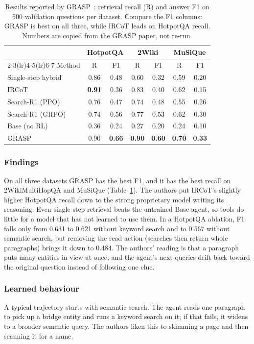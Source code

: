 \documentclass[conference]{IEEEtran}
\begin{document}
\begin{table}[t]
\centering
\caption{Results reported by GRASP~\cite{gandhi2026grasp}: retrieval recall (R) and answer F1 on 500 validation questions per dataset. Compare the F1 columns: GRASP is best on all three, while IRCoT leads on HotpotQA recall. Numbers are copied from the GRASP paper, not re-run.}
\label{tab:grasp}
\setlength{\tabcolsep}{4pt}
\footnotesize
\begin{tabular}{@{}lcccccc@{}}
\toprule
 & \multicolumn{2}{c}{HotpotQA} & \multicolumn{2}{c}{2Wiki} & \multicolumn{2}{c}{MuSiQue} \\
\cmidrule(lr){2-3}\cmidrule(lr){4-5}\cmidrule(lr){6-7}
Method & R & F1 & R & F1 & R & F1 \\
\midrule
Single-step hybrid   & 0.86 & 0.48 & 0.60 & 0.32 & 0.59 & 0.20 \\
IRCoT                & \textbf{0.91} & 0.36 & 0.83 & 0.40 & 0.62 & 0.15 \\
Search-R1 (PPO)      & 0.76 & 0.47 & 0.74 & 0.48 & 0.55 & 0.26 \\
Search-R1 (GRPO)     & 0.74 & 0.56 & 0.77 & 0.53 & 0.62 & 0.30 \\
Base (no RL)         & 0.36 & 0.24 & 0.27 & 0.20 & 0.24 & 0.10 \\
GRASP                & 0.90 & \textbf{0.66} & \textbf{0.90} & \textbf{0.60} & \textbf{0.70} & \textbf{0.33} \\
\bottomrule
\end{tabular}
\end{table}

\subsubsection{Findings}
On all three datasets GRASP has the best F1, and it has the best recall on 2WikiMultiHopQA and MuSiQue (Table~\ref{tab:grasp}). The authors put IRCoT's slightly higher HotpotQA recall down to the strong proprietary model writing its reasoning. Even single-step retrieval beats the untrained Base agent, so tools do little for a model that has not learned to use them. In a HotpotQA ablation, F1 falls only from 0.631 to 0.621 without keyword search and to 0.567 without semantic search, but removing the read action (searches then return whole paragraphs) brings it down to 0.484. The authors' reading is that a paragraph puts many entities in view at once, and the agent's next queries drift back toward the original question instead of following one clue.

\subsubsection{Learned behaviour}
A typical trajectory starts with semantic search. The agent reads one paragraph to pick up a bridge entity and runs a keyword search on it; if that fails, it widens to a broader semantic query. The authors liken this to skimming a page and then scanning it for a name.
\end{document}
